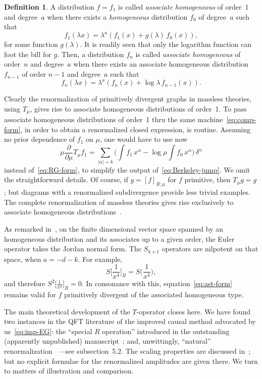 \documentclass[a4paper,12pt]{article}
\renewcommand{\a}{\alpha}          %
\newcommand{\del}{\partial}        %
\newcommand{\dl}{\delta}           %
\newcommand{\la}{\lambda}          %
\newcommand{\7}{\dagger}           %
\theoremstyle{plain}
\theoremstyle{definition}
\newtheorem{defn}{Definition}       %
\begin{document}
\begin{defn}
A distribution $f = f_1$ is called \textit{associate homogeneous} of
order~1 and degree~$a$ when there exists a \textit{homogeneous}
distribution $f_0$ of degree~$a$ such that
$$
f_1(\la x) = \la^a(f_1(x) + g(\la) \,f_0(x)),
$$
for some function $g(\la)$. It is readily seen that only the logarithm
function can foot the bill for $g$. Then, a distribution $f_n$ is
called \textit{associate homogeneous} of order~$n$ and degree~$a$ when
there exists an associate homogeneous distribution $f_{n-1}$ of order
$n-1$ and degree~$a$ such that
$$
f_n(\la x) = \la^a(f_n(x) + \log\la \,f_{n-1}(x)).
$$
\end{defn}

Clearly the renormalization of primitively divergent graphs in
massless theories, using $T_\mu$, gives rise to associate homogeneous
distributions of order~1. To pass associate homogeneous distributions
of order~1 thru the same machine~\eqref{eq:comp-form}, in order to
obtain a renormalized closed expression, is routine. Assuming no prior
dependence of $f_1$ on $\mu$, one would have to use now
$$
\mu\frac{\del}{\del\mu} T_\mu f_1 = \sum_{|\a|=k}
\biggl( \int f_1\,x^\a  - \log\mu \int f_0\,x^\a \biggr)\,\dl^\a
$$
instead of~\eqref{eq:RG-form}, to simplify the output
of~\eqref{eq:Berkeley-jump}. We omit the straightforward details. Of
course, if $g = [f]_{R;\mu}$ for $f$ primitive, then $T_\mu g = g$;
but diagrams with a renormalized subdivergence provide less trivial
examples. The complete renormalization of massless theories gives rise
exclusively to associate homogeneous distributions~\cite{Flora}.

As remarked in~\cite{ClassicalRussian}, on the finite dimensional
vector space spanned by an homogeneous distribution and its associates
up to a given order, the Euler operator takes the Jordan normal form.
The $S_{k+1}$ operators are nilpotent on that space, when $a = -d-k$.
For example,
$$
S\biggl[\frac{1}{x^4}\biggr]_R  = S\biggl(\frac{1}{x^4}\biggr),
$$
and therefore $S^2\bigl[\frac{1}{x^4}\bigr]_R = 0$. In consonance with
this, equation~\eqref{eq:ast-form} remains valid for $f$ primitively
divergent of the associated homogeneous type.

\smallskip

The main theoretical development of the $T$-operator closes here. We
have found two instances in the QFT literature of the improved causal
method advocated by us~\eqref{eq:imp-EG}: the ``special $R$
operation'' introduced in the outstanding (apparently unpublished)
manuscript~\cite{ThreefromRussia}; and, unwittingly, ``natural''
renormalization~\cite{NR} ---see subsection~5.2. The scaling
properties are discussed in~\cite{ThreefromRussia}; but no explicit
formulae for the renormalized amplitudes are given there. We turn to
matters of illustration and comparison.
\end{document}

